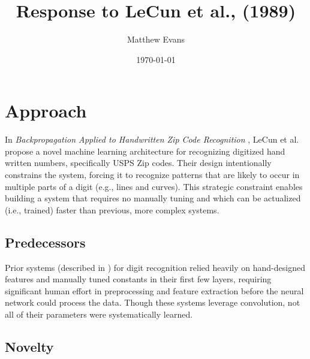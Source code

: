 \documentclass[10pt]{article}
\title{
    Response to LeCun et al., (1989) \\
}
\author{Matthew Evans}
\date{\today}
\begin{document}
\maketitle

\section*{Approach}
In \textit{Backpropagation Applied to Handwritten Zip Code Recognition} \cite{lecun1998gradient}, LeCun et al. propose a novel machine learning architecture for recognizing digitized hand written numbers, specifically USPS Zip codes. Their design intentionally constrains the system, forcing it to recognize patterns that are likely to occur in multiple parts of a digit (e.g., lines and curves). This strategic constraint enables building a system that requires no manually tuning and which can be actualized (i.e., trained) faster than previous, more complex systems.

\subsection*{Predecessors}

Prior systems (described in \cite{Denker1989}) for digit recognition relied heavily on hand-designed features and manually tuned constants in their first few layers, requiring significant human effort in preprocessing and feature extraction before the neural network could process the data. Though these systems leverage convolution, not all of their parameters were systematically learned.





\subsection*{Novelty}
\end{document}
